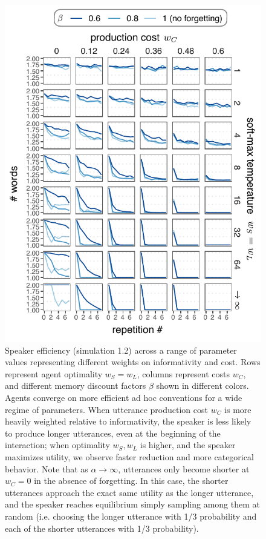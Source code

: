 \documentclass[11pt, floatsintext]{apa6}
\begin{document}
 \begin{figure}
\centering
    \includegraphics[scale=1.2]{conjuction_grid.pdf}
  \caption{Speaker efficiency (simulation 1.2) across a range of parameter values representing different weights on informativity and cost. Rows represent agent optimality $w_S = w_L$, columns represent costs $w_C$, and different memory discount factors $\beta$ shown in different colors. Agents converge on more efficient ad hoc conventions for a wide regime of parameters. When utterance production cost $w_C$ is more heavily weighted relative to informativity, the speaker is less likely to produce longer utterances, even at the beginning of the interaction; when optimality $w_S, w_L$ is higher, and the speaker maximizes utility, we observe faster reduction and more categorical behavior. Note that as $\alpha\rightarrow\infty$, utterances only become shorter at $w_C=0$ in the absence of forgetting. In this case, the shorter utterances approach the exact same utility as the longer utterance, and the speaker reaches equilibrium simply sampling among them at random (i.e. choosing the longer utterance with 1/3 probability and each of the shorter utterances with 1/3 probability).}
  \label{fig:conjunction_grid}
\end{figure}
\end{document}
